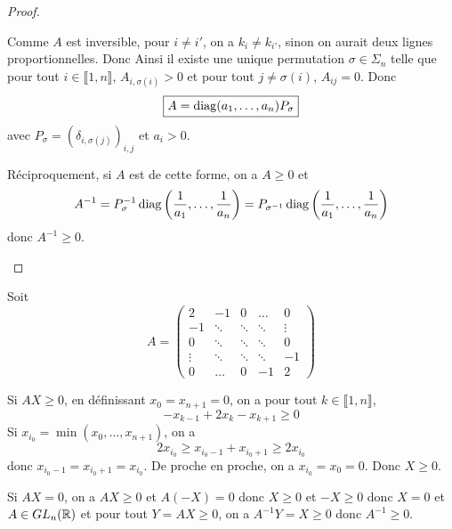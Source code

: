 \documentclass[12pt]{article}
\begin{document}
\begin{proof}
\begin{enumerate}
        Comme $A$ est inversible, pour $i\neq i'$, on a $k_{i}\neq k_{i'}$, sinon on aurait deux lignes proportionnelles. Donc 
        Ainsi il existe une unique permutation $\sigma\in\Sigma_{n}$ telle que pour tout $i\in\llbracket1,n\rrbracket$, $A_{i,\sigma(i)}>0$ et pour tout $j\neq\sigma(i)$, $A_{ij}=0$. Donc 
        \begin{equation}
            \boxed{A=\operatorname{diag}(a_{1},\dots,a_{n})P_{\sigma}}
        \end{equation}
        avec $P_{\sigma}=(\delta_{i,\sigma(j)})_{i,j}$ et $a_{i}>0$.

        Réciproquement, si $A$ est de cette forme, on a $A\geqslant0$ et 
        \begin{equation}
            A^{-1}=P^{-1}_{\sigma}\operatorname{diag}\left(\frac{1}{a_{1}},\dots,\frac{1}{a_{n}}\right)=P_{\sigma^{-1}}\operatorname{diag}\left(\frac{1}{a_{1}},\dots,\frac{1}{a_{n}}\right)
        \end{equation}
        donc $A^{-1}\geqslant0$.
    \end{enumerate}
\end{proof}

\begin{remark}
    Soit 
    \begin{equation}
        A=
        \begin{pmatrix}
            2   & -1    & 0   &\dots &0\\
            -1  & \ddots&\ddots     &\ddots&\vdots\\
            0   & \ddots&\ddots     &\ddots&0\\
            \vdots&\ddots&\ddots&\ddots&-1\\
            0&\dots&0&-1&2
        \end{pmatrix}
    \end{equation}

    Si $AX\geqslant0$, en définissant $x_{0}=x_{n+1}=0$, on a pour tout $k\in\llbracket1,n\rrbracket$,
    \begin{equation}
        -x_{k-1}+2x_{k}-x_{k+1}\geqslant0
    \end{equation}
    Si $x_{i_{0}}=\min(x_{0},\dots,x_{n+1})$, on a 
    \begin{equation}
        2x_{i_{0}}\geqslant x_{i_{0}-1}+x_{i_{0}+1}\geqslant 2x_{i_{0}}
    \end{equation}
    donc $x_{i_{0}-1}=x_{i_{0}+1}=x_{i_{0}}$. De proche en proche, on a $x_{i_{0}}=x_{0}=0$. Donc $X\geqslant0$.

    Si $AX=0$, on a $AX\geqslant0$ et $A(-X)=0$ donc $X\geqslant0$ et $-X\geqslant0$ donc $X=0$ et $A\in GL_{n}(\mathbb{R})$ et pour tout $Y=AX\geqslant0$, on a $A^{-1}Y=X\geqslant0$ donc $A^{-1}\geqslant0$.
\end{remark}
\end{document}
